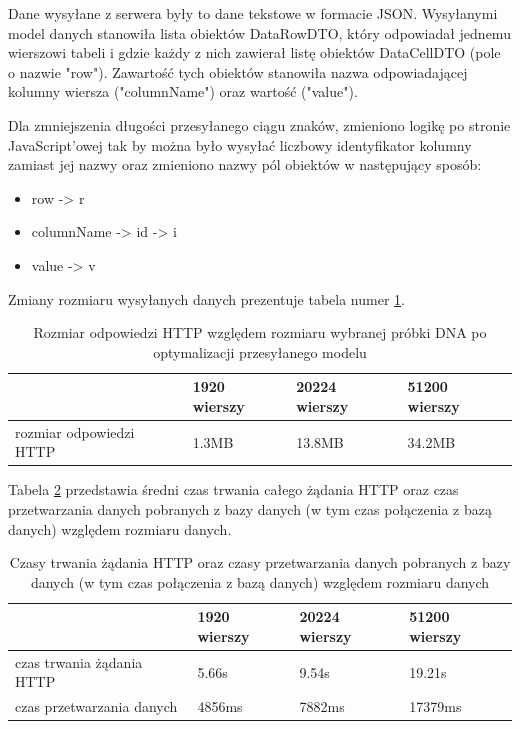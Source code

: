 \documentclass[a4paper,12pt,twoside]{article}
\begin{document}
Dane wysyłane z serwera były to dane tekstowe w formacie JSON.
Wysyłanymi model danych stanowiła lista obiektów DataRowDTO, 
który odpowiadał jednemu wierszowi tabeli i gdzie każdy z nich zawierał listę obiektów DataCellDTO (pole o nazwie "row"). Zawartość tych obiektów stanowiła nazwa 
odpowiadającej kolumny wiersza ("columnName") oraz wartość ("value").

Dla zmniejszenia długości przesyłanego ciągu znaków, 
zmieniono logikę po stronie JavaScript'owej tak by 
można było wysyłać liczbowy identyfikator kolumny zamiast jej nazwy
oraz zmieniono nazwy pól obiektów w następujący sposób:

\begin{itemize}
\item row -> r
\item columnName -> id -> i
\item value -> v
\end{itemize}

Zmiany rozmiaru wysyłanych danych prezentuje tabela numer \ref{table:requestSizeOpt}.

\begin{center}
\begin{table} [H]
\begin{tabular}{| p{4cm} | p{2.7cm} | p{2.7cm} | p{2.7cm}|}
\hline
& 1920 wierszy &  20224 wierszy & 51200 wierszy\\ 
\hline
rozmiar odpowiedzi HTTP& 1.3MB&13.8MB& 34.2MB\\ \hline  
\end{tabular}

\caption{Rozmiar odpowiedzi HTTP względem rozmiaru wybranej próbki DNA po optymalizacji przesyłanego modelu}
\label{table:requestSizeOpt}
\end{table}
\end{center} 





\newpage
Tabela \ref{table:httpRequestTime} przedstawia średni czas trwania 
całego żądania HTTP oraz czas przetwarzania danych pobranych z bazy danych
(w tym czas połączenia z bazą danych) względem rozmiaru danych.

\begin{center}
\begin{table} [H]
\begin{tabular}{| p{3cm} | p{3cm} | p{3cm} | p{3cm}|}
\hline
& 1920 wierszy &  20224 wierszy & 51200 wierszy\\ 
\hline
czas trwania żądania HTTP& 5.66s & 9.54s & 19.21s \\ \hline  
czas przetwarzania danych& 4856ms& 7882ms& 17379ms\\ \hline  
\end{tabular}
\caption{Czasy trwania żądania HTTP  oraz czasy przetwarzania danych pobranych z bazy danych (w tym czas połączenia z bazą danych) względem rozmiaru danych }
\label{table:httpRequestTime}
\end{table}
\end{center} 
\end{document}
